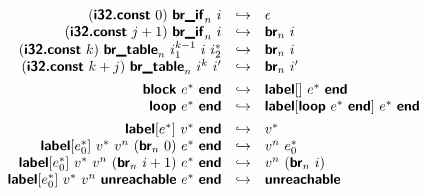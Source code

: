 \documentclass[a4paper]{scrartcl}
\newcommand\void[1]{}
\newcommand\evalto{\hookrightarrow}
\newcommand\K[1]{\ensuremath{\textsf{#1}}}
\newcommand\KK[1]{\ensuremath{\K{\textbf{#1}}}}
\begin{document}
$$
\begin{array}{rcl}
(\KK{i32.const}~0)~\KK{br\_if}_n~i &\evalto&
  \epsilon \\
(\KK{i32.const}~j+1)~\KK{br\_if}_n~i &\evalto&
  \KK{br}_n~i \\
(\KK{i32.const}~k)~\KK{br\_table}_n~i_1^{k-1}~i~i_2^\ast &\evalto&
  \KK{br}_n~i \\
(\KK{i32.const}~k+j)~\KK{br\_table}_n~i^k~i' &\evalto&
  \KK{br}_n~i' \\
[1ex]
\KK{block}~e^\ast~\KK{end} &\evalto&
  \KK{label}[]~e^\ast~\KK{end} \\
\KK{loop}~e^\ast~\KK{end} &\evalto&
  \KK{label}[\KK{loop}~e^\ast~\KK{end}]~e^\ast~\KK{end} \\
[1ex]
\KK{label}[e^\ast]~v^\ast~\KK{end} &\evalto&
  v^\ast \\
\KK{label}[e_0^\ast]~v^\ast~v^n~(\KK{br}_n~0)~e^\ast~\KK{end} &\evalto&
  v^n~e_0^\ast \\
\KK{label}[e_0^\ast]~v^\ast~v^n~(\KK{br}_n~i+1)~e^\ast~\KK{end} &\evalto&
 v^n~(\KK{br}_n~i) \\
\KK{label}[e_0^\ast]~v^\ast~v^n~\KK{unreachable}~e^\ast~\KK{end} &\evalto&
 \KK{unreachable} \\
[1ex]
\end{array}
$$

\void{
$$
\frac{
  C \vdash e_0^\ast : [t^\ast]/\bot
  \qquad
  C \vdash e^\ast : [t^\ast]/\bot
}{
  C \vdash \KK{label}[e_0^\ast]~e^\ast~\KK{end} : [] \to [t^\ast]/\bot
}
$$
}
\end{document}
